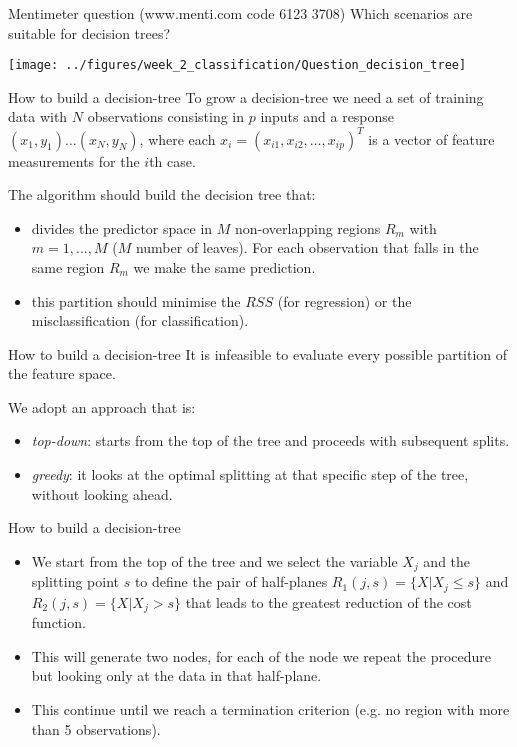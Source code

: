 \documentclass[notes]{beamer}          %
\begin{document}
\begin{frame}{Mentimeter question (www.menti.com code 6123 3708)}
Which scenarios are suitable for decision trees?
\begin{center}
\texttt{[image: ../figures/week\_2\_classification/Question\_decision\_tree]}  
\end{center}
\end{frame}



\begin{frame}{How to build a decision-tree}
To grow a decision-tree we need a set of training data with $N$ observations consisting in $p$ inputs and a response
$(x_1,y_1) \dots (x_N,y_N)$, where each $x_i=(x_{i1}, x_{i2}, \dots, x_{ip})^T$ is a vector of feature measurements for the $i$th case.

\vspace{0.5cm}

The algorithm should build the decision tree that:

\begin{itemize}
\item divides the predictor space in $M$ non-overlapping regions $R_m$ with $m=1,...,M$ ($M$ number of leaves). For each observation that falls in the same region $R_m$ we make the same prediction.
\item this partition should minimise the $RSS$ (for regression) or the misclassification (for classification).
\end{itemize}
\end{frame}

\begin{frame}{How to build a decision-tree}
It is infeasible to evaluate every possible partition of the feature space.

\vspace{0.5cm}
We adopt an approach that is:
\begin{itemize}
	\item \textit{top-down}: starts from the top of the tree and proceeds with subsequent splits.
	\item \textit{greedy}: it looks at the optimal splitting at that specific step of the tree, without looking ahead. 
\end{itemize}
\end{frame}

\begin{frame}{How to build a decision-tree}
\begin{itemize}
	\item We start from the top of the tree and we select the variable $X_j$ and the splitting point $s$ to define the pair of half-planes $R_1(j,s)=\{X|X_j \le s\}$ and $R_2(j,s)=\{X|X_j > s\}$ that leads to the greatest reduction of the cost function.
	\item This will generate two nodes, for each of the node we repeat the procedure but looking only at the data in that half-plane. 
	\item This continue until we reach a termination criterion (e.g. no region with more than 5 observations).
\end{itemize}	

\end{frame}
\end{document}
